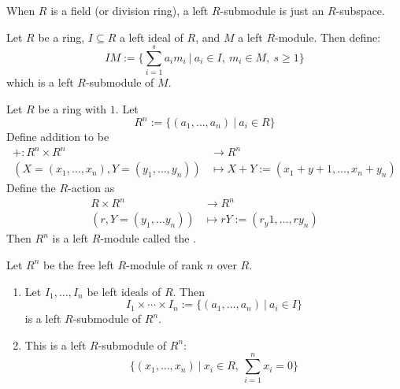 \begin{remark}
When $R$ is a field (or division ring), a left $R$-submodule is just an $R$-subspace.	
\end{remark}

\begin{example}
Let $R$ be a ring, $I \subseteq R$ a left ideal of $R$, and $M$ a left $R$-module. Then define:
\begin{equation}
IM := \{ \sum_{i=1}^s a_i m_i \ | \ a_i \in I, \ m_i \in M, \ s \geq 1\} \nonumber
\end{equation}
which is a left $R$-submodule of $M$.
\end{example}

\begin{example}
 Let $R$ be a ring with $1$. Let
\begin{equation}
R^n := \{(a_1, \ldots, a_n) \ | \ a_i \in R\} \nonumber
\end{equation}
Define addition to be
\begin{align}
+: R^n \times R^n &\rightarrow R^n \nonumber \\
(X=(x_1, \ldots, x_n), Y = (y_1, \ldots, y_n)) &\mapsto X+Y := (x_1 + y+1, \ldots, x_n + y_n) \nonumber
\end{align}
Define the $R$-action as
\begin{align}
R \times R^n &\rightarrow R^n \nonumber \\
(r, Y = (y_1, \ldots y_n)) &\mapsto rY := (r_y1, \ldots, ry_n) \nonumber
\end{align}
Then $R^n$ is a left $R$-module called the .
\end{example}

\begin{example}
Let $R^n$ be the free left $R$-module of rank $n$ over $R$.
\begin{enumerate}[label=(\roman*)]
\item Let $I_1, \ldots, I_n$ be left ideals of $R$. Then
\begin{equation}
I_1 \times \cdots \times I_n := \{(a_1, \ldots, a_n) \ | \ a_i \in I\} \nonumber
\end{equation}
is a left $R$-submodule of $R^n$.
\item This is a left $R$-submodule of $R^n$:
\begin{equation}
\{(x_1, \ldots, x_n) \ | \ x_i \in R, \ \sum_{i=1}^n x_i = 0\} \nonumber
\end{equation}
\end{enumerate}
\end{example}

